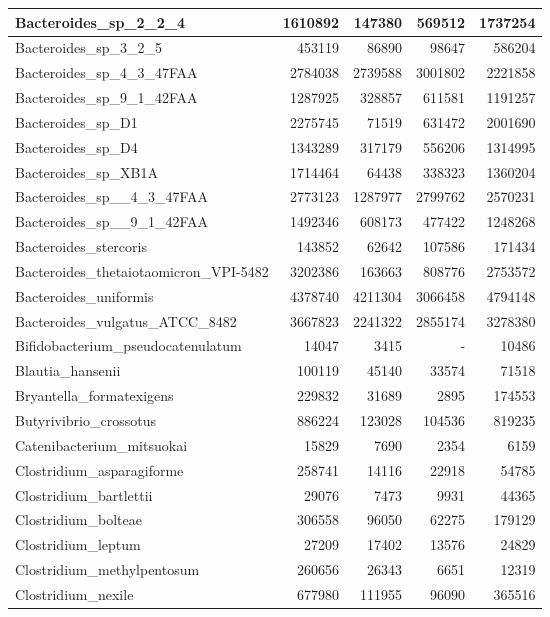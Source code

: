 \documentclass[12pt,a4paper]{article}
\begin{document}
\begin{table}[ht]
\begin{center}
\begin{tabular}{|l*{4}{|r}|}
Bacteroides\_sp\_2\_2\_4 & 1610892 & 147380 & 569512 & 1737254 \\ \hline
Bacteroides\_sp\_3\_2\_5 & 453119 & 86890 & 98647 & 586204 \\ \hline
Bacteroides\_sp\_4\_3\_47FAA & 2784038 & 2739588 & 3001802 & 2221858 \\ \hline
Bacteroides\_sp\_9\_1\_42FAA & 1287925 & 328857 & 611581 & 1191257 \\ \hline
Bacteroides\_sp\_D1 & 2275745 & 71519 & 631472 & 2001690 \\ \hline
Bacteroides\_sp\_D4 & 1343289 & 317179 & 556206 & 1314995 \\ \hline
Bacteroides\_sp\_XB1A & 1714464 & 64438 & 338323 & 1360204 \\ \hline
Bacteroides\_sp\_\_4\_3\_47FAA & 2773123 & 1287977 & 2799762 & 2570231 \\ \hline
Bacteroides\_sp\_\_9\_1\_42FAA & 1492346 & 608173 & 477422 & 1248268 \\ \hline
Bacteroides\_stercoris & 143852 & 62642 & 107586 & 171434 \\ \hline
Bacteroides\_thetaiotaomicron\_VPI-5482 & 3202386 & 163663 & 808776 & 2753572 \\ \hline
Bacteroides\_uniformis & 4378740 & 4211304 & 3066458 & 4794148 \\ \hline
Bacteroides\_vulgatus\_ATCC\_8482 & 3667823 & 2241322 & 2855174 & 3278380 \\ \hline
Bifidobacterium\_pseudocatenulatum & 14047 & 3415 & - & 10486 \\ \hline
Blautia\_hansenii & 100119 & 45140 & 33574 & 71518 \\ \hline
Bryantella\_formatexigens & 229832 & 31689 & 2895 & 174553 \\ \hline
Butyrivibrio\_crossotus & 886224 & 123028 & 104536 & 819235 \\ \hline
Catenibacterium\_mitsuokai & 15829 & 7690 & 2354 & 6159 \\ \hline
Clostridium\_asparagiforme & 258741 & 14116 & 22918 & 54785 \\ \hline
Clostridium\_bartlettii & 29076 & 7473 & 9931 & 44365 \\ \hline
Clostridium\_bolteae & 306558 & 96050 & 62275 & 179129 \\ \hline
Clostridium\_leptum & 27209 & 17402 & 13576 & 24829 \\ \hline
Clostridium\_methylpentosum & 260656 & 26343 & 6651 & 12319 \\ \hline
Clostridium\_nexile & 677980 & 111955 & 96090 & 365516 \\ \hline

\end{tabular}
\end{center}
\end{table}
\end{document}
